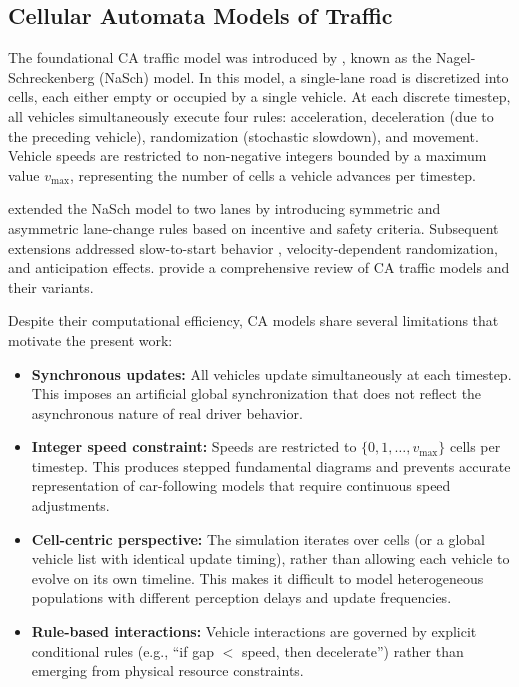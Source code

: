\documentclass[review,authoryear]{elsarticle}
\begin{document}
\subsection{Cellular Automata Models of Traffic}
\label{sec:lit_ca}

The foundational CA traffic model was introduced by \citet{nagel1992cellular}, known as the Nagel-Schreckenberg (NaSch) model. In this model, a single-lane road is discretized into cells, each either empty or occupied by a single vehicle. At each discrete timestep, all vehicles simultaneously execute four rules: acceleration, deceleration (due to the preceding vehicle), randomization (stochastic slowdown), and movement. Vehicle speeds are restricted to non-negative integers bounded by a maximum value $v_{\max}$, representing the number of cells a vehicle advances per timestep.

\citet{rickert1996two} extended the NaSch model to two lanes by introducing symmetric and asymmetric lane-change rules based on incentive and safety criteria. Subsequent extensions addressed slow-to-start behavior \citep{knospe2000towards}, velocity-dependent randomization, and anticipation effects. \citet{maerivoet2005cellular} provide a comprehensive review of CA traffic models and their variants.

Despite their computational efficiency, CA models share several limitations that motivate the present work:

\begin{itemize}
    \item \textbf{Synchronous updates:} All vehicles update simultaneously at each timestep. This imposes an artificial global synchronization that does not reflect the asynchronous nature of real driver behavior.

    \item \textbf{Integer speed constraint:} Speeds are restricted to $\{0, 1, \ldots, v_{\max}\}$ cells per timestep. This produces stepped fundamental diagrams and prevents accurate representation of car-following models that require continuous speed adjustments.

    \item \textbf{Cell-centric perspective:} The simulation iterates over cells (or a global vehicle list with identical update timing), rather than allowing each vehicle to evolve on its own timeline. This makes it difficult to model heterogeneous populations with different perception delays and update frequencies.

    \item \textbf{Rule-based interactions:} Vehicle interactions are governed by explicit conditional rules (e.g., ``if gap $<$ speed, then decelerate'') rather than emerging from physical resource constraints.
\end{itemize}
\end{document}
